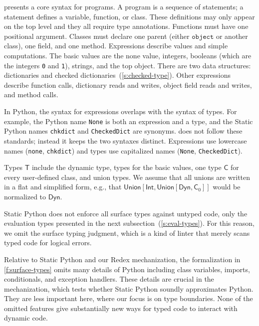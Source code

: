 \documentclass[english,cleveref,submission]{programming}
\newcommand{\SP}{Static Python}
\newcommand{\code}[1]{\texttt{#1}}
\newcommand{\typefont}[1]{\mathsf{#1}}
\newcommand{\paramtype}[2]{#1[#2]}
\newcommand{\sptype}{\typefont{T}}
\newcommand{\sptclass}{\typefont{C}}
\newcommand{\sptint}{\typefont{Int}}
\newcommand{\sptdyn}{\typefont{Dyn}}
\newcommand{\sptunion}[1]{\paramtype{\typefont{Union}}{#1}}
\newcommand{\spobject}{\code{object}}
\begin{document}
 presents a core syntax for programs.
A program is a sequence of statements;
a statement defines a variable, function, or class.
These definitions may only appear on the top level
and they all require type annotations.
Functions must have one positional argument.
Classes must declare one parent (either $\spobject$ or another class), one field, and one method.
Expressions describe values and simple computations.
The basic values are the none value, integers,
booleans (which are the integers \code{0} and \code{1}), strings, and the top object.
There are two data structures: dictionaries and checked dictionaries~(\cref{s:checked-type}).
Other expressions describe function calls, dictionary reads and writes, object field reads and writes,
and method calls.

In Python, the syntax for expressions overlaps with the syntax of types.
For example, the Python name \code{None} is both an expression and a type,
and the \SP{} names \code{chkdict} and \code{CheckedDict} are synonyms.
 does not follow these standards; instead it keeps the two syntaxes distinct.
Expressions use lowercase names (\code{none}, \code{chkdict}) and types use capitalized
names (\code{None}, \code{CheckedDict}).

Types $\sptype$ include the dynamic type, types for the basic values, one type $\sptclass$ for every
user-defined class, and union types.
We assume that all unions are written in a flat and simplified form, e.g., that
$\sptunion{\sptint, \sptunion{\sptdyn, \sptclass_0}}$ would be normalized to $\sptdyn$.

\SP{} does not enforce all surface types against untyped code, only the evaluation
types presented in the next subsection~(\cref{s:eval-types}).
For this reason, we omit the surface typing judgment, which is a kind of linter
that merely scans typed code for logical errors.

Relative to \SP{} and our Redex mechanization, the formalization in \cref{f:surface-types} omits
many details of Python including class variables, imports, conditionals, and exception handlers.
These details are crucial in the mechanization, which tests whether \SP{}
soundly approximates Python.
They are less important here, where our focus is on type boundaries.
None of the omitted features give substantially new ways for typed code to interact with dynamic code.
\end{document}
